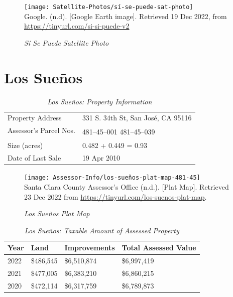 \begin{figure}[hbtp]
  \centering
  \caption[Sí Se Puede Satellite Photo]{\textit{Sí Se Puede Satellite Photo}}\label{fig:sí-se-puede-sat-photo}
  \texttt{[image: Satellite-Photos/sí-se-puede-sat-photo]}\\ %
  \footnotesize
  Google. (n.d). [Google Earth image]. Retrieved 19 Dec 2022, from \url{https://tinyurl.com/si-si-puede-v2} %
\end{figure}


\clearpage
\section{Los Sueños}\label{sec:los-suenos-info}\indent

\begin{table}[htbp]
  \SingleSpacing%
  \caption[Los Sueños: Property Information]{\textit{Los Sueños: Property Information}}\label{tab:los-sueños-prop-info}
  \begin{tabular}{ll}
    \toprule
    Property Address       & 331 S. 34th St, San José, CA 95116 \\
    Assessor's Parcel Nos. & \multirow[t]{2}{1in}{481–45–001 481–45–039} \\
    \\
    Size (acres)           & 0.482 + 0.449 = 0.93 \\
    Date of Last Sale      & 19 Apr 2010 \\
    \bottomrule
  \end{tabular}
\end{table}

\begin{figure}[hbtp]
  \caption[Los Sueños Plat Map]{\textit{Los Sueños Plat Map}}\label{fig:los-sueños-plat-map}
  \texttt{[image: Assessor-Info/los-sueños-plat-map-481-45]}\\ %
  \footnotesize{Santa Clara County Assessor's Office (n.d.). [Plat Map]. Retrieved 23 Dec 2022 from  \url{https://tinyurl.com/los-suenos-plat-map}}.
\end{figure}

\begin{table}[hbtp]
  \SingleSpacing%
  \caption[Los Sueños: Taxable Amount of Assessed Propery]{\textit{Los Sueños: Taxable Amount of Assessed Property}}\label{tab:los-sueños-taxable-amount}
  \begin{tabular}{llll}
    \toprule
    Year & Land      & Improvements & Total Assessed Value \\
    \midrule
    2022 & \$486,545 & \$6,510,874  & \$6,997,419 \\
    2021 & \$477,005 & \$6,383,210  & \$6,860,215 \\
    2020 & \$472,114 & \$6,317,759  & \$6,789,873 \\
    \bottomrule
  \end{tabular}
\end{table}

